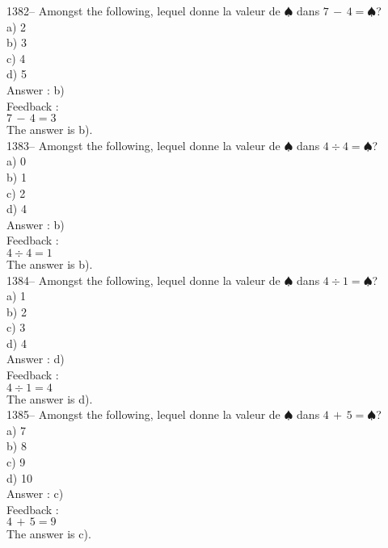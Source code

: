 ﻿\documentclass[letterpaper, 12pt]{article}
\begin{document}
1382-- Amongst the following, lequel donne la valeur de
$\spadesuit$ dans $7\,-\,4=\spadesuit$?\\
a) 2\\
b) 3\\
c) 4\\
d) 5\\

Answer : b)\\

Feedback : \\
$7\,-\,4=3$\\
The answer is b).\\

1383-- Amongst the following, lequel donne la valeur de
$\spadesuit$ dans $4\div4=\spadesuit$?\\
a) 0\\
b) 1\\
c) 2\\
d) 4\\

Answer : b)\\

Feedback : \\
$4\div4=1$\\
The answer is b).\\

1384-- Amongst the following, lequel donne la valeur de
$\spadesuit$ dans $4\div1=\spadesuit$?\\
a) 1\\
b) 2\\
c) 3\\
d) 4\\

Answer : d)\\

Feedback : \\
$4\div1=4$\\
The answer is d).\\

1385-- Amongst the following, lequel donne la valeur de
$\spadesuit$ dans $4\,+\,5=\spadesuit$?\\
a) 7\\
b) 8\\
c) 9\\
d) 10\\

Answer : c)\\

Feedback : \\
$4\,+\,5=9$\\
The answer is c).\\
\end{document}
